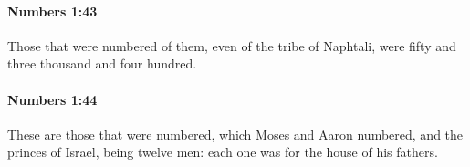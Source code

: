 		\paragraph{Numbers 1:43} %
			\label{NUMBERS-1-43}

			Those that were numbered of them, even of the tribe of Naphtali, were fifty and three thousand and four hundred.


		\paragraph{Numbers 1:44} %
			\label{NUMBERS-1-44}

			These are those that were numbered, which Moses and Aaron numbered, and the princes of Israel, being twelve men: each one was for the house of his fathers.


